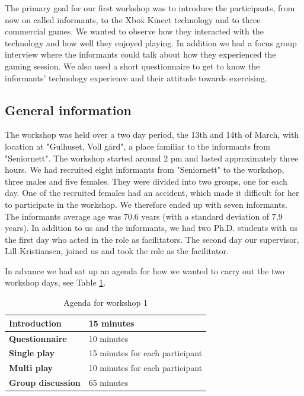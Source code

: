 The primary goal for our first workshop was to introduce the participants, from now on called informants, to the Xbox Kinect technology and to three commercial games. We wanted to observe how they interacted with the technology and how well they enjoyed playing. In addition we had a focus group interview where the informants could talk about how they experienced the gaming session. We also used a short questionnaire to get to know the informants' technology experience and their attitude towards exercising.   

\subsection{General information}
The workshop was held over a two day period, the 13th and 14th of March, with location at "Gulhuset, Voll gård", a place familiar to the informants from "Seniornett". The workshop started around 2 pm and lasted approximately three hours. We had recruited eight informants from "Seniornett" to the workshop, three males and five females. They were divided into two groups, one for each day. One of the recruited females had an accident, which made it difficult for her to participate in the workshop. We therefore ended up with seven informants. The informants average age was 70.6 years (with a standard deviation of 7,9 years). In addition to us and the informants, we had two Ph.D. students with us the first day who acted in the role as facilitators. The second day our supervisor, Lill Kristiansen, joined us and took the role as the facilitator.   

In advance we had sat up an agenda for how we wanted to carry out the two workshop days,  see Table \ref{tab:agendaW1}.  

\begin{table} [H]
\centering
    \begin{tabular}{|l|l|}
       \hline
       \textbf{Introduction} & 15 minutes  \\ \hline
       \textbf{Questionnaire} & 10 minutes  \\ \hline
       \textbf{Single play} & 15 minutes for each participant \\ \hline
       \textbf{Multi play} & 10 minutes for each participant \\ \hline
	   \textbf{Group discussion} & 65 minutes \\ \hline
    \end{tabular}
    \caption[Workshop 1 agenda]{Agenda for workshop 1}
    \label{tab:agendaW1}
\end{table}  

